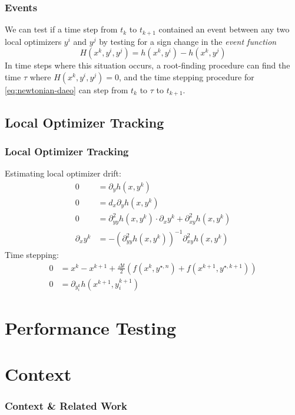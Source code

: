 \documentclass[10pt]{beamer}
\begin{document}
\begin{frame}
	\frametitle{Events}
	We can test if a time step from $t_k$ to $t_{k+1}$ contained an event between any two local optimizers $y^i$ and $y^j$ by testing for a sign change in the \textit{event function}
	\begin{equation}
		H(x^k, y^i, y^j) = h(x^k, y^i) - h(x^k, y^j)
	\end{equation}
	\vfill
	\vfill
	In time steps where this situation occurs, a root-finding procedure can find the time $\tau$ where $H(x^k, y^i, y^j) = 0$, and the time stepping procedure for \eqref{eq:newtonian-daeo} can step from $t_k$ to $\tau$ to $t_{k+1}$.
	\vfill
\end{frame}

\subsection{Local Optimizer Tracking}

\begin{frame}
	\frametitle{Local Optimizer Tracking}
Estimating local optimizer drift:
	\begin{equation*}
		\label{eq:local-tracking-guess}
		\begin{aligned}
			0&=\partial_{y}h(x, y^k)\\
			0&=d_x\partial_yh(x, y^k)\\
			0&=\partial^2_{yy}h(x, y^k)\cdot\partial_xy^k + \partial^2_{xy}h(x,y^k)\\
			\partial_xy^k &= -\left(\partial^2_{yy}h(x,y^k)\right)^{-1}\partial^2_{xy}h(x, y^k)
		\end{aligned}
	\end{equation*}
	Time stepping:
	\begin{equation}
		\label{eq:integrator-with-tracking}
		\begin{aligned}
			0 &= x^k - x^{k+1} + \frac{\Delta t}{2}\left(f(x^k, 	y^{\star,n})+f(x^{k+1}, y^{\star,k+1})\right)\\
			0 &= \partial_{y^k_i}h\left(x^{k+1}, y^{k+1}_i\right)
		\end{aligned}
	\end{equation}
\end{frame}

\section{Performance Testing}
\section{Context}
\begin{frame}
	\frametitle{Context \& Related Work}
\end{frame}
\end{document}
